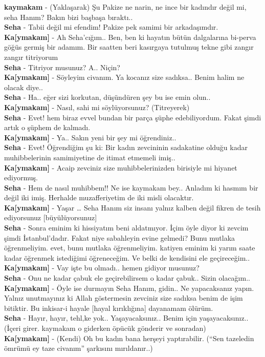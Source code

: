 \documentclass[]{book}
\begin{document}
\textbf{kaymakam} - (Yaklaşarak) Şu Pakize ne narin, ne ince bir kadındır değil mi, seha Hanım? Bakın bizi başbaşa bıraktı..\\
\textbf{Seha} - Tabii değil mi efendim! Pakize pek samimi bir arkadaşımdır.\\
\textbf{Ka{[}ymakam{]}} - Ah Seha'cığım.. Ben, ben ki hayatın bütün dalgalarına bi-perva göğüs germiş bir adamım. Bir saatten beri kasırgaya tutulmuş tekne gibi zangır zangır titriyorum\\
\textbf{Seha} - Titriyor musunuz? A.. Niçin?\\
\textbf{Ka{[}ymakam{]}} - Söyleyim civanım. Ya kocanız size sadıksa.. Benim halim ne olacak diye..\\
\textbf{Seha} - Ha.. eğer sizi korkutan, düşündüren şey bu ise emin olun..\\
\textbf{Ka{[}ymakam{]}} - Nasıl, sahi mi söylüyorsunuz? (Titreyerek)\\
\textbf{Seha} - Evet! hem biraz evvel bundan bir parça şüphe edebiliyordum. Fakat şimdi artık o şüphem de kalmadı.\\
\textbf{Ka{[}ymakam{]}} - Ya.. Sakın yeni bir şey mi öğrendiniz..\\
\textbf{Seha} - Evet! Öğrendiğim şu ki: Bir kadın zevcininin sadakatine olduğu kadar muhibbelerinin samimiyetine de itimat etmemeli imiş..\\
\textbf{Ka{[}ymakam{]}} - Acaip zevciniz size muhibbelerinizden birisiyle mi hiyanet ediyormuş.\\
\textbf{Seha} - Hem de nasıl muhibbem!! Ne ise kaymakam bey.. Anladım ki hasmım bir değil iki imiş. Herhalde muzafferiyetim de iki misli olacaktır.\\
\textbf{Ka{[}ymakam{]}} - Yaşar \ldots{} Seha Hanım siz insanı yalnız kalben değil fikren de tesih ediyorsunuz {[}büyülüyorsunuz{]}\\
\textbf{Seha} - Sonra eminim ki hissiyatım beni aldatmıyor. İçim öyle diyor ki zevcim şimdi İstanbul'dadır. Fakat niye sabahleyin evine gelmedi? Bunu mutlaka öğrenmeliyim. evet, bunu mutlaka öğrenmeliyim. katiyen eminim ki yarım saate kadar öğrenmek istediğimi öğreneceğim. Ve belki de kendisini ele geçireceğim..\\
\textbf{Ka{[}ymakam{]}} - Vay işte bu olmadı.. hemen gidiyor musunuz?\\
\textbf{Seha} - Onu ne kadar çabuk ele geçirebilirsem o kadar çabuk.. Sizin olacağım..
\textbf{Ka{[}ymakam{]}} - Öyle ise durmayın Seha Hanım, gidin.. Ne yapacaksanız yapın. Yalnız unutmayınız ki Allah göstermesin zevciniz size sadıksa benim de işim bitiktir. Bu inkisar-i hayale {[}hayal kırıklığına{]} dayanamam ölürüm.\\
\textbf{Seha} - Hayır, hayır, tehl,ke yok.. Yaşayacaksınız.. Benim için yaşayacaksınız.. (İçeri girer. kaymakam o giderken öpücük gönderir ve sonradan)\\
\textbf{Ka{[}ymakam{]}} - (Kendi) Oh bu kadın bana herşeyi yaptırabilir. (``Sen tazeledin ömrümü ey taze civanım'' şarkısını mırıldanır..)\\
\end{document}
